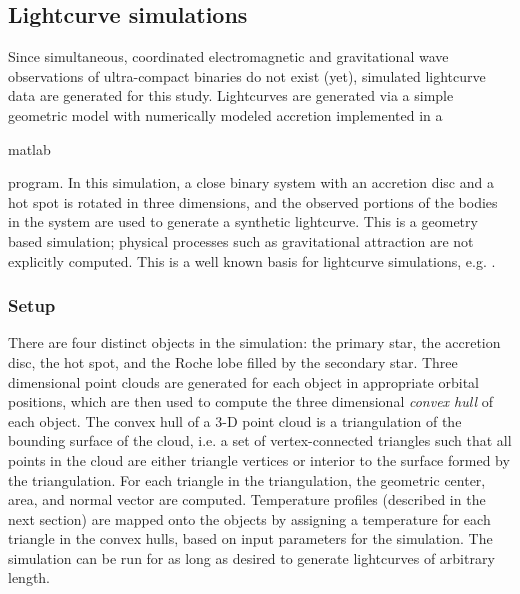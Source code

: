 \documentclass[preprint2]{aastex}
\begin{document}
\subsection{Lightcurve simulations}\label{sec.LightCurve}

Since simultaneous, coordinated electromagnetic and gravitational wave
observations of ultra-compact binaries do not exist (yet), simulated
lightcurve data are generated for this study.  Lightcurves are
generated via a simple geometric model with numerically modeled
accretion implemented in a \begin{sc}matlab\end{sc} program.  In this
simulation, a close binary system with an accretion disc and a hot
spot is rotated in three dimensions, and the observed portions of the
bodies in the system are used to generate a synthetic lightcurve.
This is a geometry based simulation; physical processes such as gravitational attraction are not
explicitly computed.  This is a well known basis for lightcurve simulations,
e.g. \cite{1971ApJ...166..605W}.

\subsubsection{Setup}

There are four distinct objects in the simulation: the primary star,
the accretion disc, the hot spot, and the Roche lobe filled by the
secondary star.  Three dimensional point clouds are generated for each
object in appropriate orbital positions, which are then used to
compute the three dimensional \textit{convex hull} of each object.
The convex hull of a 3-D point cloud is a triangulation of the
bounding surface of the cloud, i.e. a set of vertex-connected
triangles such that all points in the cloud are either triangle
vertices or interior to the surface formed by the triangulation.  For
each triangle in the triangulation, the geometric center, area, and
normal vector are computed.  Temperature profiles (described in the
next section) are mapped onto the objects by assigning a temperature
for each triangle in the convex hulls, based on input parameters for
the simulation.  The simulation can be run for as long as desired to
generate lightcurves of arbitrary length.

\end{document}

